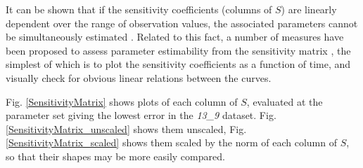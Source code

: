 \documentclass[10pt,journal]{./IEEE_latex_class/IEEEtran}
\begin{document}
It can be shown that if the sensitivity coefficients (columns of $S$) are linearly dependent over the range of observation values, the associated parameters cannot be simultaneously estimated \cite{Beck}. Related to this fact, a number of measures have been proposed to assess parameter estimability from the sensitivity matrix \cite{Mclean2012}, the simplest of which is to plot the sensitivity coefficients as a function of time, and visually check for obvious linear relations between the curves.

Fig. \ref{SensitivityMatrix} shows plots of each column of $S$, evaluated at the parameter set giving the lowest error in the \textit{13\_9} dataset. Fig. \ref{SensitivityMatrix_unscaled} shows them unscaled, Fig. \ref{SensitivityMatrix_scaled} shows them scaled by the norm of each column of $S$, so that their shapes may be more easily compared.
\end{document}
